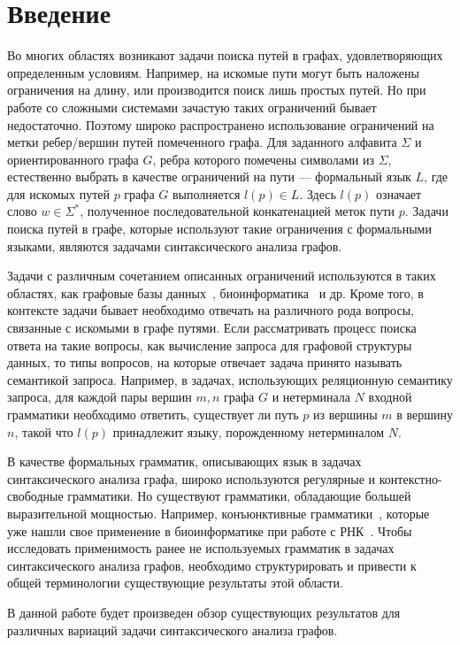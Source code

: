\section*{Введение}

Во многих областях возникают задачи поиска путей в графах, удовлетворяющих определенным условиям. Например, на искомые пути могут быть наложены ограничения на длину, или производится поиск лишь простых путей. Но при работе со сложными системами зачастую таких ограничений бывает недостаточно. Поэтому широко распространено использование ограничений на метки ребер/вершин путей помеченного графа. Для заданного алфавита $\Sigma$ и ориентированного графа $G$, ребра которого помечены символами из $\Sigma$, естественно выбрать в качестве ограничений на пути --- формальный язык $L$, где для искомых путей $p$ графа $G$ выполняется $l(p) \in L$. Здесь $l(p)$ означает слово $w \in \Sigma^*$, полученное последовательной конкатенацией меток пути $p$. Задачи поиска путей в графе, которые используют такие ограничения с формальными языками, являются задачами синтаксического анализа графов.

Задачи с различным сочетанием описанных ограничений используются в таких областях, как графовые базы данных~\cite{graphDB}, биоинформатика~\cite{Anderson} и др. Кроме того, в контексте задачи бывает необходимо отвечать на различного рода вопросы, связанные с искомыми в графе путями. Если рассматривать процесс поиска ответа на такие вопросы, как вычисление запроса для графовой структуры данных, то типы вопросов, на которые отвечает задача принято называть семантикой запроса. Например, в задачах, использующих реляционную семантику запроса, для каждой пары вершин $m, n$ графа $G$ и нетерминала $N$ входной грамматики необходимо ответить, существует ли путь $p$ из вершины $m$ в вершину $n$, такой что $l(p)$ принадлежит языку, порожденному нетерминалом $N$.

В качестве формальных грамматик, описывающих язык в задачах синтаксического анализа графа, широко используются регулярные и контекстно-свободные грамматики. Но существуют грамматики, обладающие большей выразительной мощностью. Например, конъюнктивные грамматики~\cite{conjunctiveGrammar}, которые уже нашли свое применение в биоинформатике при работе с РНК~\cite{ConjunctiveRNA}. Чтобы исследовать применимость ранее не используемых грамматик в задачах синтаксического анализа графов, необходимо структурировать и привести к общей терминологии существующие результаты этой области.

В данной работе будет произведен обзор существующих результатов для различных вариаций задачи синтаксического анализа графов.



